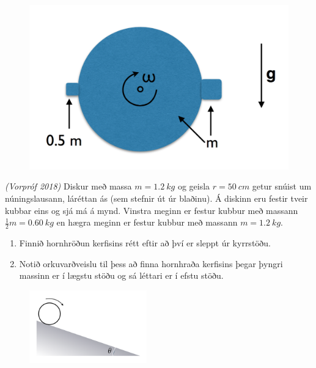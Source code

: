 \ifdefined \wholebook \else\documentclass[oneside]{book}\usepackage{EdlBook}\graphicspath{{figures/}}
\begin{document}
\begin{enumerate}[label = \textbf{Dæmi \thechapter.\arabic*.}]
\begin{minipage}{\linewidth}
\begin{figure}
\vspace{-1.25cm}
\includegraphics[scale = 0.25]{images/snuens.png}
\end{figure}

\item \textit{(Vorpróf 2018)} Diskur með massa $m = \SI{1.2}{kg}$ og geisla $r = \SI{50}{cm}$ getur snúist um núningslausann, láréttan ás (sem stefnir út úr blaðinu). Á diskinn eru festir tveir kubbar eins og sjá má á mynd. Vinstra meginn er festur kubbur með massann $\frac{1}{2}m = \SI{0.60}{kg}$ en hægra meginn er festur kubbur með massann $m = \SI{1.2}{kg}$.
\end{minipage}

\begin{enumerate}[label = \textbf{(\alph*)}]
    \item Finnið hornhröðun kerfisins rétt eftir að því er sleppt úr kyrrstöðu.
    \item Notið orkuvarðveislu til þess að finna hornhraða kerfisins þegar þyngri massinn er í lægstu stöðu og sá léttari er í efstu stöðu.
\end{enumerate}

\begin{minipage}{\linewidth}

\begin{figure}
\vspace{-0.5cm}
\includegraphics[width=2in]{images/rulla.png}
\end{figure}



\end{minipage}
\end{enumerate}
\end{document}
